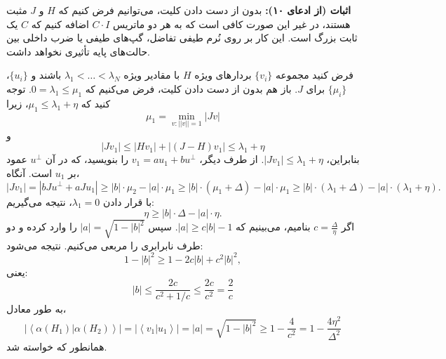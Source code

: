 \textbf{اثبات (از ادعای ۱۰):}  
بدون از دست دادن کلیت، می‌توانیم فرض کنیم که $H$ و $J$ مثبت هستند، در غیر این صورت کافی است که به هر دو ماتریس $C \cdot I$ اضافه کنیم که $C$ یک ثابت بزرگ است. این کار بر روی نُرم طیفی تفاضل، گپ‌های طیفی یا ضرب داخلی بین حالت‌های پایه تأثیری نخواهد داشت.  

فرض کنید مجموعه $\{ v_i \}$ بردارهای ویژه $H$ با مقادیر ویژه $ \lambda_1 < \dots < \lambda_N $ باشند و $\{ u_i \}$، $\{ \mu_i \}$ برای $J$. باز هم بدون از دست دادن کلیت، فرض می‌کنیم که $ 0 = \lambda_1 \leq \mu_1 $. توجه کنید که $ \mu_1 \leq \lambda_1 + \eta $، زیرا
 $$ \mu_1 = \min_{v: ||v||=1} |Jv| $$
  و
$$ |Jv_1| \leq |Hv_1| + |(J - H)v_1| \leq \lambda_1 + \eta $$
  بنابراین، $ |Jv_1| \leq \lambda_1 + \eta $. از طرف دیگر، $ v_1 = a u_1 + b u^\perp $ را بنویسید، که در آن $ u^\perp $ عمود بر $ u_1 $ است. آنگاه،  
\[
|Jv_1| = |bJu^\perp + aJu_1| \geq |b| \cdot \mu_2 - |a| \cdot \mu_1 \geq |b| \cdot (\mu_1 + \Delta) - |a| \cdot \mu_1 \geq |b| \cdot (\lambda_1 + \Delta) - |a| \cdot (\lambda_1 + \eta).
\]
با قرار دادن $ \lambda_1 = 0 $، نتیجه می‌گیریم:  
\[
\eta \geq |b| \cdot \Delta - |a| \cdot \eta.
\]
اگر $ c = \frac{\Delta}{\eta} $ بنامیم، می‌بینیم که $ |a| \geq c |b| - 1 $.  
سپس $ |a| = \sqrt{1 - |b|^2} $ را وارد کرده و دو طرف نابرابری را مربعی می‌کنیم. نتیجه می‌شود:
\[
1 - |b|^2 \geq 1 - 2c |b| + c^2 |b|^2,
\]
یعنی:
\[|b| \leqslant \frac{{2c}}{{{c^2} + 1/c}} \leqslant \frac{{2c}}{{{c^2}}} = \frac{2}{c}\]
به طور معادل،
\[\left| {\left\langle {\alpha ({H_1})|\alpha ({H_2})} \right\rangle } \right| = \left| {\left\langle {{v_1}|{u_1}} \right\rangle } \right| = |a| = \sqrt {1 - |b{|^2}}  \geqslant 1 - \frac{4}{{{c^2}}} = 1 - \frac{{4{\eta ^2}}}{{{\Delta ^2}}}\]
 همانطور که خواسته شد.

